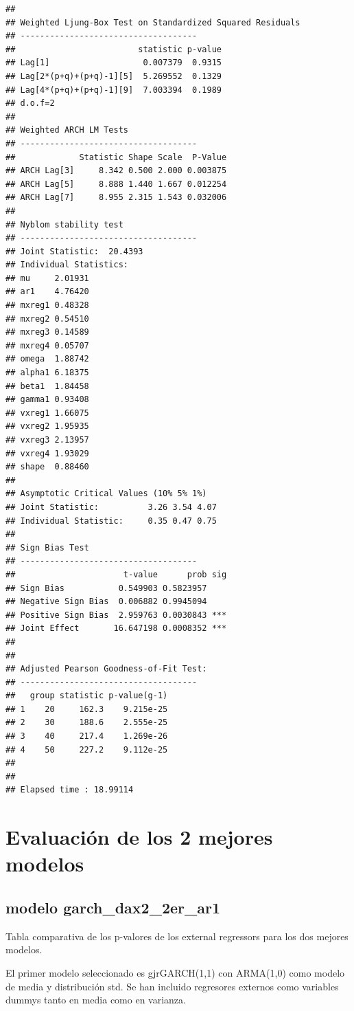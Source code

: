 \documentclass[
  11pt,
]{article}
\begin{document}
\begin{verbatim}
## 
## Weighted Ljung-Box Test on Standardized Squared Residuals
## ------------------------------------
##                         statistic p-value
## Lag[1]                   0.007379  0.9315
## Lag[2*(p+q)+(p+q)-1][5]  5.269552  0.1329
## Lag[4*(p+q)+(p+q)-1][9]  7.003394  0.1989
## d.o.f=2
## 
## Weighted ARCH LM Tests
## ------------------------------------
##             Statistic Shape Scale  P-Value
## ARCH Lag[3]     8.342 0.500 2.000 0.003875
## ARCH Lag[5]     8.888 1.440 1.667 0.012254
## ARCH Lag[7]     8.955 2.315 1.543 0.032006
## 
## Nyblom stability test
## ------------------------------------
## Joint Statistic:  20.4393
## Individual Statistics:              
## mu     2.01931
## ar1    4.76420
## mxreg1 0.48328
## mxreg2 0.54510
## mxreg3 0.14589
## mxreg4 0.05707
## omega  1.88742
## alpha1 6.18375
## beta1  1.84458
## gamma1 0.93408
## vxreg1 1.66075
## vxreg2 1.95935
## vxreg3 2.13957
## vxreg4 1.93029
## shape  0.88460
## 
## Asymptotic Critical Values (10% 5% 1%)
## Joint Statistic:          3.26 3.54 4.07
## Individual Statistic:     0.35 0.47 0.75
## 
## Sign Bias Test
## ------------------------------------
##                      t-value      prob sig
## Sign Bias           0.549903 0.5823957    
## Negative Sign Bias  0.006882 0.9945094    
## Positive Sign Bias  2.959763 0.0030843 ***
## Joint Effect       16.647198 0.0008352 ***
## 
## 
## Adjusted Pearson Goodness-of-Fit Test:
## ------------------------------------
##   group statistic p-value(g-1)
## 1    20     162.3    9.215e-25
## 2    30     188.6    2.555e-25
## 3    40     217.4    1.269e-26
## 4    50     227.2    9.112e-25
## 
## 
## Elapsed time : 18.99114
\end{verbatim}

\hypertarget{evaluaciuxf3n-de-los-2-mejores-modelos}{%
\section{Evaluación de los 2 mejores
modelos}\label{evaluaciuxf3n-de-los-2-mejores-modelos}}

\hypertarget{modelo-garch_dax2_2er_ar1}{%
\subsection{modelo
garch\_dax2\_2er\_ar1}\label{modelo-garch_dax2_2er_ar1}}

Tabla comparativa de los p-valores de los external regressors para los
dos mejores modelos.

El primer modelo seleccionado es gjrGARCH(1,1) con ARMA(1,0) como modelo
de media y distribución std. Se han incluido regresores externos como
variables dummys tanto en media como en varianza.
\end{document}
